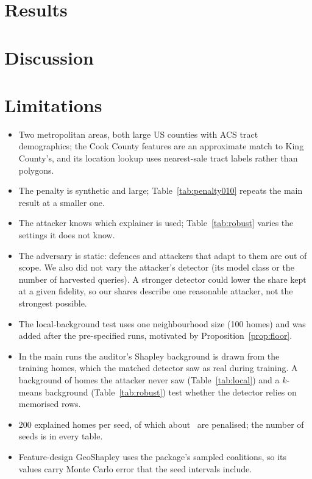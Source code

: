 \documentclass[11pt]{article}
\newcommand{\1}{\mathbf{1}}
\begin{document}
\section{Results}\label{sec:results}


\section{Discussion}


\section{Limitations}
\begin{itemize}
  \item Two metropolitan areas, both large US counties with ACS tract demographics; the Cook County features are
        an approximate match to King County's, and its location lookup uses nearest-sale tract labels rather than
        polygons.
  \item The penalty is synthetic and large; Table~\ref{tab:penalty010} repeats the main result at a smaller one.
  \item The attacker knows which explainer is used; Table~\ref{tab:robust} varies the settings it does not know.
  \item The adversary is static: defences and attackers that adapt to them are out of scope. We also did not vary the
        attacker's detector (its model class or the number of harvested queries). A stronger detector could lower the
        share kept at a given fidelity, so our shares describe one reasonable attacker, not the strongest possible.
  \item The local-background test uses one neighbourhood size (100 homes) and was added after the pre-specified runs,
        motivated by Proposition~\ref{prop:floor}.
  \item In the main runs the auditor's Shapley background is drawn from the training homes, which the matched
        detector saw as real during training. A background of homes the attacker never saw (Table~\ref{tab:local})
        and a $k$-means background (Table~\ref{tab:robust}) test whether the detector relies on memorised rows.
  \item 200 explained homes per seed, of which about \NPenFeature\ are penalised; the number of seeds is in every table.
  \item Feature-design GeoShapley uses the package's sampled coalitions, so its values carry Monte Carlo error that the
        seed intervals include.
\end{itemize}
\end{document}

